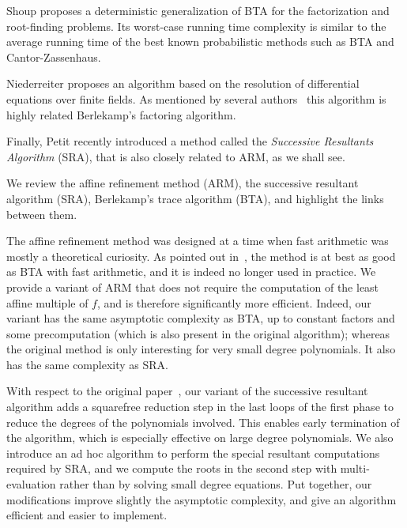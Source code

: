 \documentclass{sig-alternate}
\newcounter{algo}
\renewcommand{\paragraph}[1]{\smallskip\noindent{{\bf \rm #1.}}}
\begin{document}
Shoup\cite{Shoup91b} proposes a deterministic generalization of BTA for the factorization and root-finding problems. Its worst-case running time complexity is similar to the average running time of the best known probabilistic methods such as BTA and Cantor-Zassenhaus.

Niederreiter\cite{nied94} proposes an algorithm based on the resolution of differential equations over finite fields.  As mentioned by several authors~\cite{Fleis96} this algorithm is highly related Berlekamp's factoring algorithm.


Finally, Petit\cite{cgUCL-P14} recently introduced a method called the \emph{Successive Resultants Algorithm} (SRA), that is also closely related to ARM, as we shall see.






\paragraph{Our contribution}
We review the affine refinement method (ARM), the successive resultant algorithm (SRA), Berlekamp's trace algorithm (BTA), and highlight the links between them.

The affine refinement method was designed at a time when fast arithmetic was mostly a theoretical curiosity. As pointed out in~\cite{cgUCL-P14}, the method is at best as good as BTA with fast arithmetic, and it is indeed no longer used in practice. We provide a variant of ARM that does not require the computation of the least affine multiple of $f$, and is therefore significantly more efficient. Indeed, our variant  has the same asymptotic complexity as BTA, up to constant factors and some precomputation (which is also present in the original algorithm); whereas the original method is only interesting for very small degree polynomials. It also has the same complexity as SRA.

With respect to the original paper~\cite{cgUCL-P14}, our variant of the successive resultant algorithm adds a squarefree reduction step in the last loops of the first phase to reduce the degrees of the polynomials involved. This enables early termination of the algorithm, which is especially effective on large degree polynomials. We also introduce an ad hoc algorithm to perform the special resultant computations required by SRA, and we compute the roots in the second step with multi-evaluation rather than by solving small degree equations. Put together, our modifications improve slightly the asymptotic complexity, and give an algorithm efficient and easier to implement.
\end{document}
